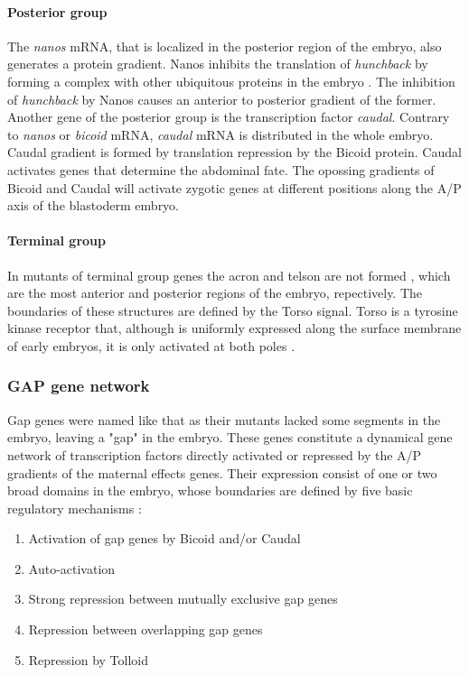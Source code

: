 \paragraph{Posterior group}
The \textit{nanos} mRNA, that is localized in the posterior region of the embryo, also generates a protein gradient. Nanos inhibits the translation of \textit{hunchback} \citep{Tautz1988} by forming a complex with other ubiquitous proteins in the embryo \citep{Cho2006}. The inhibition of \textit{hunchback} by Nanos causes an anterior to posterior gradient of the former. 
Another gene of the posterior group is the transcription factor \textit{caudal}. Contrary to \textit{nanos} or \textit{bicoid} mRNA, \textit{caudal} mRNA is distributed in the whole embryo.
Caudal gradient is formed by translation repression by the Bicoid protein. Caudal activates genes that determine the abdominal fate. 
The opossing gradients of Bicoid and Caudal will activate zygotic genes at different positions along the A/P axis of the blastoderm embryo.

\paragraph{Terminal group}
In mutants of terminal group genes the acron and telson are not formed \citep{Klingler1988}, which are the most anterior and posterior regions of the embryo, repectively. 
The boundaries of these structures are defined by the Torso signal. 
Torso is a tyrosine kinase receptor that, although is uniformly expressed along the surface membrane of early embryos, it is only activated at both poles \citep{Casanova1989}.



\subsubsection{GAP gene network}

Gap genes were named like that as their mutants lacked some segments in the embryo, leaving a "gap" in the embryo. 
These genes constitute a dynamical gene network of transcription factors directly activated or repressed by the A/P gradients of the maternal effects genes.
Their expression consist of one or two broad domains in the embryo, whose boundaries are defined by five basic regulatory mechanisms \citep{Jaeger2004}:
\begin{enumerate}
\item Activation of gap genes by Bicoid and/or Caudal
\item Auto-activation
\item Strong repression between mutually exclusive gap genes
\item Repression between overlapping gap genes
\item Repression by Tolloid
\end{enumerate}

